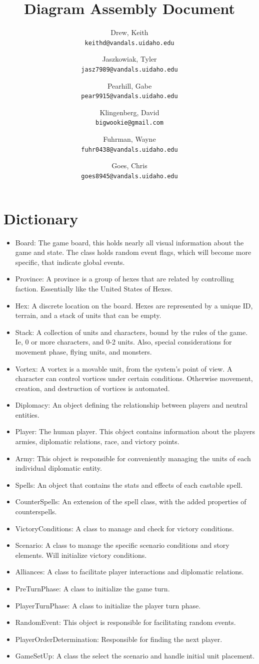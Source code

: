 \documentclass[10pt,a4paper]{article}
\author{
  Drew, Keith\\
  \texttt{keithd@vandals.uidaho.edu}
  \and
  Jaszkowiak, Tyler\\
  \texttt{jasz7989@vandals.uidaho.edu}
  \and
  Pearhill, Gabe\\
  \texttt{pear9915@vandals.uidaho.edu}
  \and
  Klingenberg, David\\
  \texttt{bigwookie@gmail.com}
  \and 
  Fuhrman, Wayne\\
  \texttt{fuhr0438@vandals.uidaho.edu}
  \and
  Goes, Chris\\
  \texttt{goes8945@vandals.uidaho.edu}
}
\title{Diagram Assembly Document}
\begin{document}
\maketitle
\section{Dictionary}
\begin{itemize}
\item Board: The game board, this holds nearly all visual information about the game and state. The class holds random event flags, which will become more specific, that indicate global events.
\item Province: A province is a group of hexes that are related by controlling faction. Essentially like the United States of Hexes. 
\item Hex: A discrete location on the board. Hexes are represented by a unique ID, terrain, and a stack of units that can be empty.
\item Stack: A collection of units and characters, bound by the rules of the game. Ie, 0 or more characters, and 0-2 units. Also, special considerations for movement phase, flying units, and monsters.
\item Vortex: A vortex is a movable unit, from the system's point of view. A character can control vortices under certain conditions. Otherwise movement, creation, and destruction of vortices is automated.
\item Diplomacy: An object defining the relationship between players and neutral entities.
\item Player: The human player. This object contains information about the players armies, diplomatic relations, race, and victory points.
\item Army: This object is responsible for conveniently managing the units of each individual diplomatic entity.
\item Spells: An object that contains the stats and effects of each castable spell.
\item CounterSpells: An extension of the spell class, with the added properties of counterspells.
\item VictoryConditions: A class to manage and check for victory conditions. 
\item Scenario: A class to manage the specific scenario conditions and story elements. Will initialize victory conditions.
\item Alliances: A class to facilitate player interactions and diplomatic relations.
\item PreTurnPhase: A class to initialize the game turn.
\item PlayerTurnPhase: A class to initialize the player turn phase.
\item RandomEvent: This object is responsible for facilitating random events.
\item PlayerOrderDetermination: Responsible for finding the next player.
\item GameSetUp: A class the select the scenario and handle initial unit placement.
\end{itemize}
\end{document}

